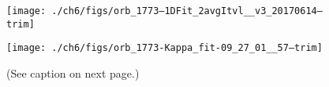   \DIFaddend %

  \begin{figure}
    \centering


    \noindent\texttt{[image: ./ch6/figs/orb\_1773--1DFit\_2avgItvl\_\_v3\_20170614--trim]}

    \vspace{1cm}

    \noindent\texttt{[image: ./ch6/figs/orb\_1773-Kappa\_fit-09\_27\_01\_\_57--trim]}

    \caption[Example one- and two-dimensional fits of observed inverted-V
    electron distributions (Orbit 1773)]{(See caption on next page.)}
    \label{ch6:Fig2}
  \end{figure}


